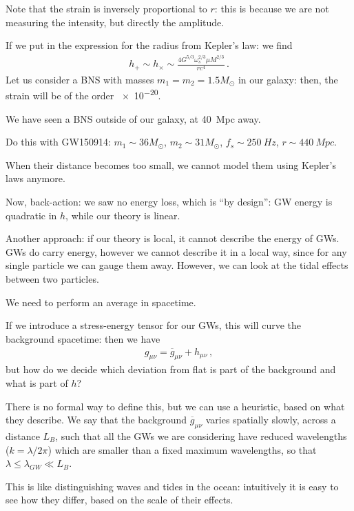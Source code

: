 \documentclass[main.tex]{subfiles}
\begin{document}
Note that the strain is inversely proportional to \(r\): this is because we are not measuring the intensity, but directly the amplitude. 

If we put in the expression for the radius from Kepler's law: we find 
%
\begin{align}
h_{+} \sim h_{ \times } \sim \frac{4 G^{5/3} \omega_{s}^{2/3} \mu M^{2/3}}{r c^{4}}
\,.
\end{align}
%
Let us consider a BNS with masses \(m_1 = m_2 = 1.5 M_{\odot}\) in our galaxy: then, the strain will be  of the order \num{e-20}.

We have seen a BNS outside of our galaxy, at \SI{40}{Mpc} away. 

Do this with GW150914: \(m_1 \sim 36 M_{\odot}\), \(m_2 \sim 31 M_{\odot}\), \(f_s \sim \SI{250}{Hz}\), \(r \sim \SI{440}{Mpc}\).

When their distance becomes too small, we cannot model them using Kepler's laws anymore. 

Now, back-action: we saw no energy loss, which is ``by design'': GW energy is quadratic in \(h\), while our theory is linear. 

Another approach: if our theory is local, it cannot describe the energy of GWs. 
GWs do carry energy, however we cannot describe it in a local way, since for any single particle we can gauge them away. However, we can look at the tidal effects between two particles. 

We need to perform an average in spacetime. 

If we introduce a stress-energy tensor for our GWs, this will curve the background spacetime: then we have 
%
\begin{align}
g_{\mu \nu } = \overline{g}_{\mu \nu } + h_{\mu \nu }
\,,
\end{align}
%
but how do we decide which deviation from flat is part of the background and what is part of \(h\)?

There is no formal way to define this, but we can use a heuristic, based on what they describe. 
We say that the background \(\overline{g}_{\mu \nu }\) varies spatially slowly, across a distance \(L_B\), such that all the GWs we are considering have reduced wavelengths (\(k = \lambda /2 \pi \)) which are smaller than a fixed maximum wavelengths, so that \(\lambda  \leq \lambda_{GW} \ll L_B\). 

This is like distinguishing waves and tides in the ocean: intuitively it is easy to see how they differ, based on the scale of their effects.
\end{document}
